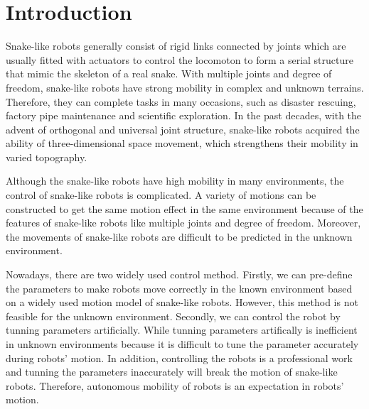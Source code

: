 \section{Introduction}
Snake-like robots generally consist of rigid links connected by joints which are usually fitted with actuators to control the locomoton to form a serial structure that mimic the skeleton of a real snake. With multiple joints and degree of freedom, 
snake-like robots have strong mobility in complex and unknown terrains\cite{Chirikjian1995The}. 
Therefore, they can complete tasks in many occasions, such as disaster 
rescuing\cite{DogAndSnake}, factory pipe maintenance\cite{ACMTutorial} 
and scientific exploration\cite{Kuwada2007Snake}. In the past decades, 
with the advent of orthogonal and universal joint structure\cite{1014757}\cite{Date2005Control}\cite{GaitBasedCompliant}, 
snake-like robots acquired the ability of three-dimensional space movement, 
which strengthens their mobility in varied topography. 

Although the snake-like robots have high mobility in many environments, the control of snake-like robots is complicated. A variety of motions can be constructed to get the same motion effect in the same environment because of the features of snake-like robots like multiple joints and degree of freedom. Moreover, the movements of snake-like robots are difficult to be predicted in the unknown environment.

Nowadays, there are two widely used control method. Firstly, we can pre-define the parameters to make robots move correctly in the known environment based on a widely used motion model\cite{HiroseSine} of snake-like robots. However, this method is not feasible for the unknown environment. Secondly, we can control the robot by tunning parameters artificially. While tunning parameters artifically is inefficient in unknown environments because it is difficult to tune the parameter accurately during robots' motion. In addition, controlling the robots is a professional work and tunning the parameters inaccurately will break the motion of snake-like robots. Therefore, autonomous mobility of robots is an expectation in robots' motion.

